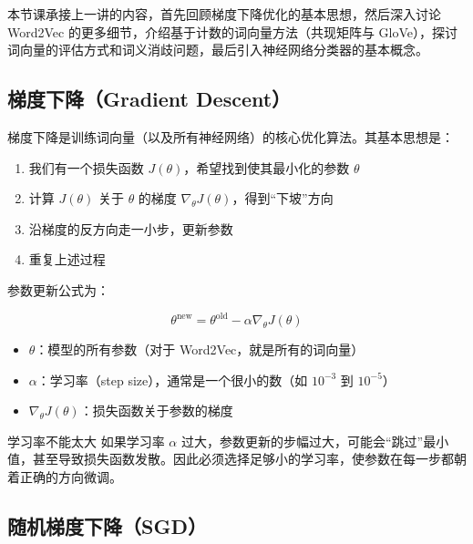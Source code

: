 \documentclass[a4paper]{article}
\begin{document}
本节课承接上一讲的内容，首先回顾梯度下降优化的基本思想，然后深入讨论 Word2Vec 的更多细节，介绍基于计数的词向量方法（共现矩阵与 GloVe），探讨词向量的评估方式和词义消歧问题，最后引入神经网络分类器的基本概念。





\subsection{梯度下降（Gradient Descent）}

梯度下降是训练词向量（以及所有神经网络）的核心优化算法。其基本思想是：

\begin{enumerate}
    \item 我们有一个损失函数 $J(\theta)$，希望找到使其最小化的参数 $\theta$
    \item 计算 $J(\theta)$ 关于 $\theta$ 的梯度 $\nabla_\theta J(\theta)$，得到``下坡''方向
    \item 沿梯度的反方向走一小步，更新参数
    \item 重复上述过程
\end{enumerate}





参数更新公式为：

$$\theta^{\text{new}} = \theta^{\text{old}} - \alpha \nabla_\theta J(\theta)$$

\begin{itemize}
    \item $\theta$：模型的所有参数（对于 Word2Vec，就是所有的词向量）
    \item $\alpha$：学习率（step size），通常是一个很小的数（如 $10^{-3}$ 到 $10^{-5}$）
    \item $\nabla_\theta J(\theta)$：损失函数关于参数的梯度
\end{itemize}





\begin{warningbox}{学习率不能太大}
如果学习率 $\alpha$ 过大，参数更新的步幅过大，可能会``跳过''最小值，甚至导致损失函数发散。因此必须选择足够小的学习率，使参数在每一步都朝着正确的方向微调。
\end{warningbox}

\subsection{随机梯度下降（SGD）}
\end{document}
